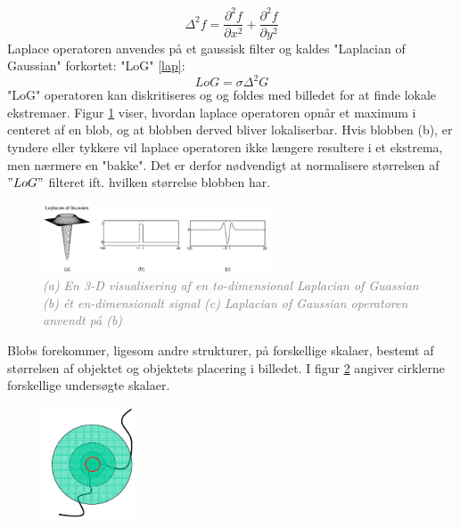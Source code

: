 \begin{equation}
\Delta^2 f = \dfrac{\partial^2 f}{\partial x^2}+\dfrac{\partial^2 f}{\partial y^2}
\end{equation}
 Laplace operatoren anvendes på et gaussisk filter og kaldes "Laplacian of Gaussian" forkortet: "LoG" \eqref{lap}:
\begin{equation}
LoG=\sigma\Delta^2G
\label{lap}
\end{equation}
"LoG" operatoren kan diskritiseres og og foldes med billedet for at finde lokale ekstremaer. Figur \ref{fig:lapgauss} viser, hvordan laplace operatoren opnår et maximum i centeret af en blob, og at blobben derved bliver lokaliserbar. Hvis blobben (b), er tyndere eller tykkere vil laplace operatoren ikke længere resultere i et ekstrema, men nærmere en "bakke". Det er derfor nødvendigt at normalisere størrelsen af $"LoG"$ filteret ift. hvilken størrelse blobben har.
\begin{figure}[H]
    \centering
    \includegraphics[width=0.60\textwidth]{fig/16.png}
    \vspace{-0.5em}   
    \begin{center}
    \caption{\textcolor{gray}{\footnotesize \textit{
    (a) En 3-D visualisering af en to-dimensional Laplacian of Guassian (b) ét en-dimensionalt signal (c) Laplacian of Gaussian operatoren anvendt på (b)}}}
    \label{fig:lapgauss}
     \end{center}
  \end{figure}
       \vspace{-2.5em}
\noindent
Blobs forekommer, ligesom andre strukturer, på forskellige skalaer, bestemt af størrelsen af objektet og objektets placering i billedet. I figur \ref{fig:scale} angiver cirklerne forskellige undersøgte skalaer.
\begin{figure}[H]
    \centering
    \includegraphics[width=0.25\textwidth]{fig/29.png}
    \vspace{-0.5em}   
    \begin{center}
    \caption{\textcolor{gray}{\footnotesize \textit{
    }}}
    \label{fig:scale}
     \end{center}
  \end{figure}
